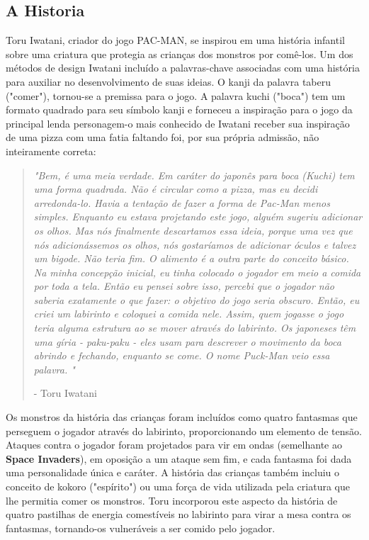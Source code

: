 \subsection{A Historia}\label{history}


Toru Iwatani, criador do jogo PAC-MAN, se inspirou em uma história infantil sobre uma criatura que protegia as crianças dos monstros por comê-los. Um dos métodos de design Iwatani incluído a palavras-chave associadas com uma história para auxiliar no desenvolvimento de suas ideias. O kanji da palavra taberu ("comer"), tornou-se a premissa para o jogo. A palavra kuchi ("boca") tem um formato quadrado para seu símbolo kanji e forneceu a inspiração para o jogo da principal lenda personagem-o mais conhecido de Iwatani receber sua inspiração de uma pizza com uma fatia faltando foi, por sua própria admissão, não inteiramente correta: 

\begin{quote}
	\textit{"Bem, é uma meia verdade. Em caráter do japonês para boca (Kuchi) tem uma forma quadrada. Não é circular como a pizza, mas eu decidi arredonda-lo. Havia a tentação de fazer a forma de Pac-Man menos simples. Enquanto eu estava projetando este jogo, alguém sugeriu adicionar os olhos. Mas nós finalmente descartamos essa ideia, porque uma vez que nós adicionássemos os olhos, nós gostaríamos de adicionar óculos e talvez um bigode. Não teria fim. O alimento é a outra parte do conceito básico. Na minha concepção inicial, eu tinha colocado o jogador em meio a comida por toda a tela. Então eu pensei sobre isso, percebi que o jogador não saberia exatamente o que fazer: o objetivo do jogo seria obscuro. Então, eu criei um labirinto e coloquei a comida nele. Assim, quem jogasse o jogo teria alguma estrutura ao se mover através do labirinto. Os japoneses têm uma gíria - paku-paku - eles usam para descrever o movimento da boca abrindo e fechando, enquanto se come. O nome Puck-Man veio essa palavra. "}

- Toru Iwatani
\end{quote}

Os monstros da história das crianças foram incluídos como quatro fantasmas que perseguem o jogador através do labirinto, proporcionando um elemento de tensão. Ataques contra o jogador foram projetados para vir em ondas (semelhante ao \textbf{Space Invaders}), em oposição a um ataque sem fim, e cada fantasma foi dada uma personalidade única e caráter. A história das crianças também incluiu o conceito de kokoro ("espírito") ou uma força de vida utilizada pela criatura que lhe permitia comer os monstros. Toru incorporou este aspecto da história de quatro pastilhas de energia comestíveis no labirinto para virar a mesa contra os fantasmas, tornando-os vulneráveis ​​a ser comido pelo jogador.

